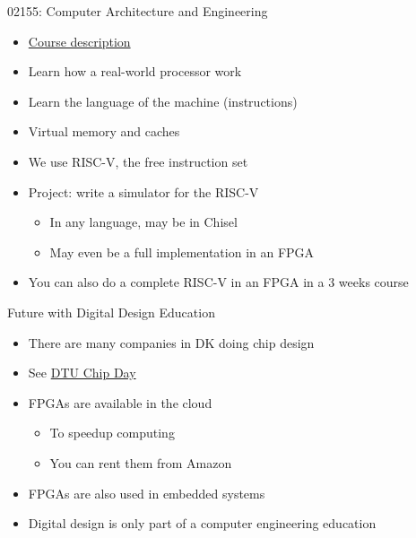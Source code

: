 \begin{frame}[fragile]{02155: Computer Architecture and Engineering}
\begin{itemize}
\item \href{http://www2.imm.dtu.dk/courses/02155/}{Course description}
\item Learn how a real-world processor work
\item Learn the language of the machine (instructions)
\item Virtual memory and caches
\item We use RISC-V, the free instruction set
\item Project: write a simulator for the RISC-V
\begin{itemize}
\item In any language, may be in Chisel
\item May even be a full implementation in an FPGA
\end{itemize}
\item You can also do a complete RISC-V in an FPGA in a 3 weeks course
\end{itemize}
\end{frame}

\begin{frame}[fragile]{Future with Digital Design Education}
\begin{itemize}
\item There are many companies in DK doing chip design
\item See \href{https://chipday.dk/}{DTU Chip Day}
\item FPGAs are available in the cloud
\begin{itemize}
\item To speedup computing
\item You can rent them from Amazon
\end{itemize}
\item FPGAs are also used in embedded systems
\item Digital design is only part of a computer engineering education
\end{itemize}
\end{frame}



